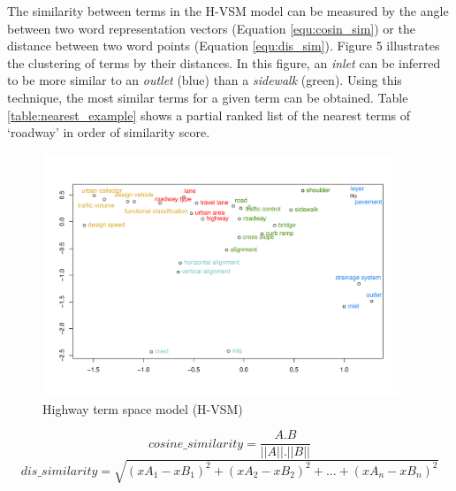\documentclass[Journal,InsideFigs, DoubleSpace]{ascelike} %
\begin{document}
{\par
The similarity between terms in the H-VSM model can be measured by the angle between two word representation vectors (Equation \ref{equ:cosin_sim}) or the distance between two word points (Equation \ref{equ:dis_sim}). Figure 5 illustrates the clustering of terms by their distances. In this figure, an \textit{inlet} can be inferred to be more similar to an \textit{outlet} (blue) than a \textit{sidewalk} (green). Using this technique, the most similar terms for a given term can be obtained. Table \ref{table:nearest_example} shows a partial ranked list of the nearest terms of `roadway' in order of similarity score.
%
\begin{figure}[t]
	\centering
	\includegraphics[width=0.95\textwidth]{Figure5_hvsm_space}
	\caption{Highway term space model (H-VSM)}
	\label{fig:hvsm}
\end{figure}
%
\begin{equation}
\label{equ:cosin_sim}
cosine\_similarity = \frac{A.B}{||A||.||B||}
\end{equation}
%
\begin{equation}
\label{equ:dis_sim}
dis\_similarity =\sqrt{(xA_1-xB_1)^2+(xA_2-xB_2)^2+...+(xA_n-xB_n)^2}
\end{equation}

}
\end{document}
